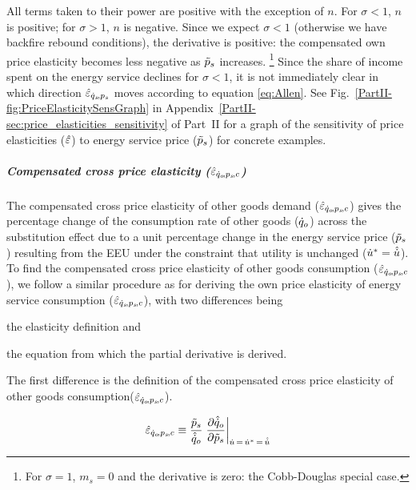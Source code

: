 \documentclass[12pt]{article}\usepackage[]{graphicx}\usepackage[]{xcolor}
\begin{document}
All terms taken to their power are positive with the exception of $n$.
For $\sigma < 1$, $n$ is positive; for $\sigma>1$, $n$ is negative.
Since we expect $\sigma < 1$ (otherwise we have backfire rebound conditions),
the derivative is positive: 
the compensated own price
elasticity becomes less negative as $\tilde{p}_s$ increases.%
\footnote{
  For $\sigma = 1$, $m_s = 0$ and the derivative
  is zero: the Cobb-Douglas special case.
}
%
Since the
share of income spent on the energy service declines for $\sigma<1$,
it is not immediately clear in which direction $\hat{\varepsilon}_{\dot{q}_s\!,p_s}$ moves according to equation \ref{eq:Allen}.
See Fig.~\ref{PartII-fig:PriceElasticitySensGraph} 
in Appendix~\ref{PartII-sec:price_elasticities_sensitivity} 
of Part~II 
for a graph of the sensitivity of price elasticities ($\hat{\varepsilon}$)
to energy service price ($\tilde{p}_s$) for concrete examples.


\subparagraph{Compensated cross price elasticity ($\hat{\varepsilon}_{\dot{q}_o\!,p_s\!,c}$)} 
\label{sec:eqopsC_CES}

The compensated cross price elasticity of other goods demand ($\hat{\varepsilon}_{\dot{q}_o\!,p_s\!,c}$)
gives the percentage change of the consumption rate of other goods ($\dot{q}_o$)
across the substitution effect
due to a unit percentage change in the energy service price ($\tilde{p}_s$)
resulting from the EEU
under the constraint that utility is unchanged 
(${\dot{u}}^* = \hat{\dot{u}}$).
To find the compensated cross price elasticity of other goods consumption ($\hat{\varepsilon}_{\dot{q}_o\!,p_s\!,c}$),
we follow a similar procedure as for deriving the 
own price elasticity of energy service consumption ($\hat{\varepsilon}_{\dot{q}_s\!,p_s\!,c}$), 
with two differences being 
%
\begin{enumerate*}[label={(\roman*)}]
	
  \item the elasticity definition and
  
  \item the equation from which the partial derivative is derived.
    
\end{enumerate*}

The first difference is 
the definition of the compensated cross price elasticity
of other goods consumption($\hat{\varepsilon}_{\dot{q}_o\!,p_s\!,c}$).

\begin{equation} \label{eq:eqopsC_def}
  \eqopsChat \equiv \frac{\amacro{p}_s}{\rasub{q}_o} \eval{\pdv{\rasub{q}_o}{\amacro{p}_s}}_{\rate{u} \, = \, \rbsub{u} \, = \, \rasub{u}}
\end{equation}
\end{document}
